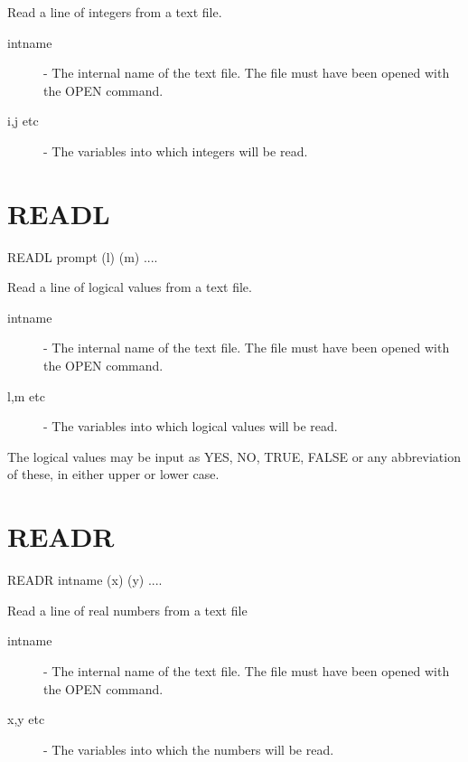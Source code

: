  Read a line of integers from a text file.

\begin{description}

\item[intname]  -  The internal name of the text file. The file must have
                   been opened with the OPEN command.

\item[i,j etc] -  The variables into which integers will be read.

\end{description}

\section{READL}


    READL \hspace{.5cm} prompt \hspace{.5cm} (l) \hspace{.5cm} (m)  ....

 Read a line of logical values from a text file.

\begin{description}

\item[intname]  -  The internal name of the text file. The file must have
                   been opened with the OPEN command.

\item[l,m etc] -  The variables into which logical values will be read.

\end{description}
The logical values may be input as YES, NO, TRUE, FALSE or any
abbreviation of these, in either upper or lower case.


\section{READR}

    READR \hspace{.5cm} intname \hspace{.5cm} (x) \hspace{.5cm} (y)  ....

 Read a line of real numbers from a text file

\begin{description}

\item[intname]  -  The internal name of the text file. The file must have
                   been opened with the OPEN command.

\item[x,y etc] -  The variables into which the numbers will be read.

\end{description}


